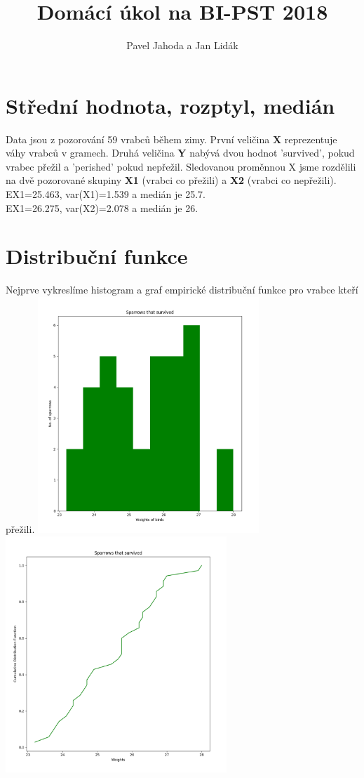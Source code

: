 \documentclass[12pt,a4paper]{article}
\begin{document}
\title{\LARGE \bf Domácí úkol na BI-PST 2018}
 \author{Pavel Jahoda a Jan Lidák}

\maketitle

\section{Střední hodnota, rozptyl, medián}
Data jsou z pozorování 59 vrabců během zimy. První veličina {\bf X} reprezentuje váhy vrabců v gramech. Druhá veličina {\bf Y} nabývá dvou hodnot 'survived', pokud vrabec přežil a 'perished' pokud nepřežil. Sledovanou proměnnou X jsme rozdělili na dvě pozorované skupiny {\bf X1} (vrabci co přežili) a {\bf X2} (vrabci co nepřežili).\\
EX1=25.463, var(X1)=1.539 a medián je 25.7.\\
EX1=26.275, var(X2)=2.078 a medián je 26.\\
\par \bigskip

\section{Distribuční funkce}
Nejprve vykreslíme histogram a graf empirické distribuční funkce pro vrabce kteří přežili. 
\includegraphics[height=3.5in]{survivedHist}
\includegraphics[height=3.5in]{survivedDist}
\end{document}

